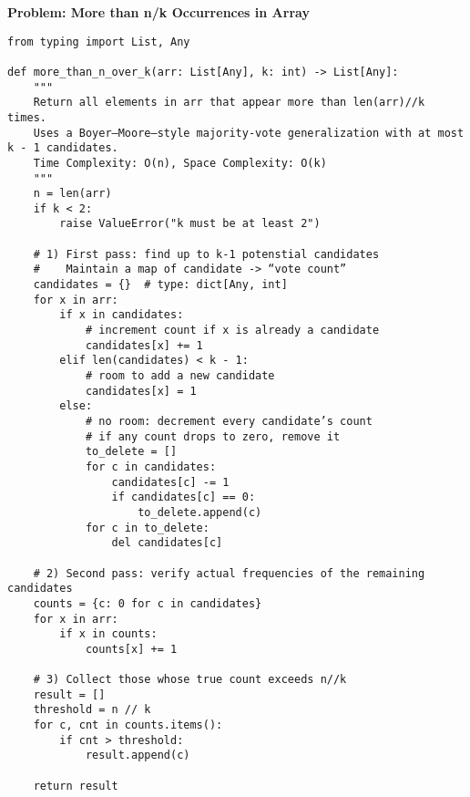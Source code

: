\noindent\textbf{Problem: More than n/k Occurrences in Array}
\begin{verbatim}
from typing import List, Any

def more_than_n_over_k(arr: List[Any], k: int) -> List[Any]:
    """
    Return all elements in arr that appear more than len(arr)//k times.
    Uses a Boyer–Moore–style majority‐vote generalization with at most k - 1 candidates.
    Time Complexity: O(n), Space Complexity: O(k)
    """
    n = len(arr)
    if k < 2:
        raise ValueError("k must be at least 2")

    # 1) First pass: find up to k-1 potenstial candidates
    #    Maintain a map of candidate -> “vote count”
    candidates = {}  # type: dict[Any, int]
    for x in arr:
        if x in candidates:
            # increment count if x is already a candidate
            candidates[x] += 1
        elif len(candidates) < k - 1:
            # room to add a new candidate
            candidates[x] = 1
        else:
            # no room: decrement every candidate’s count
            # if any count drops to zero, remove it
            to_delete = []
            for c in candidates:
                candidates[c] -= 1
                if candidates[c] == 0:
                    to_delete.append(c)
            for c in to_delete:
                del candidates[c]

    # 2) Second pass: verify actual frequencies of the remaining candidates
    counts = {c: 0 for c in candidates}
    for x in arr:
        if x in counts:
            counts[x] += 1

    # 3) Collect those whose true count exceeds n//k
    result = []
    threshold = n // k
    for c, cnt in counts.items():
        if cnt > threshold:
            result.append(c)

    return result
\end{verbatim}
% 
